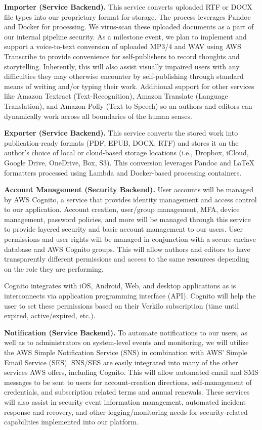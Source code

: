 \documentclass[11pt,openany]{book}
\begin{document}
\textbf{Importer (Service Backend).} This service converts uploaded RTF
or DOCX file types into our proprietary format for storage. The process
leverages Pandoc and Docker for processing. We virus-scan these uploaded
documents as a part of our internal pipeline security. As a milestone
event, we plan to implement and support a voice-to-text conversion of
uploaded MP3/4 and WAV using AWS Transcribe to provide convenience for
self-publishers to record thoughts and storytelling. Inherently, this
will also assist visually impaired users with any difficulties they may
otherwise encounter by self-publishing through standard means of writing
and/or typing their work. Additional support for other services like
Amazon Textract (Text-Recognition), Amazon Translate (Language
Translation), and Amazon Polly (Text-to-Speech) so an authors and
editors can dynamically work across all boundaries of the human senses.

\textbf{Exporter (Service Backend).} This service converts the stored
work into publication-ready formats (PDF, EPUB, DOCX, RTF) and stores it
on the author's choice of local or cloud-based storage locations (i.e.,
Dropbox, iCloud, Google Drive, OneDrive, Box, S3). This conversion
leverages Pandoc and LaTeX formatters processed using Lambda and
Docker-based processing containers.

\textbf{Account Management (Security Backend).} User accounts will be
managed by AWS Cognito, a service that provides identity management and
access control to our application. Account creation, user/group
management, MFA, device management, password policies, and more will be
managed through this service to provide layered security and basic
account management to our users. User permissions and user rights will
be managed in conjunction with a secure enclave database and AWS Cognito
groups. This will allow authors and editors to have transparently
different permissions and access to the same resources depending on the
role they are performing.

Cognito integrates with iOS, Android, Web, and desktop applications as
is interconnects via application programming interface (API). Cognito
will help the user to set these permissions based on their Verkilo
subscription (time until expired, active/expired, etc.).

\textbf{Notification (Service Backend).} To automate notifications to
our users, as well as to administrators on system-level events and
monitoring, we will utilize the AWS Simple Notification Service (SNS) in
combination with AWS' Simple Email Service (SES). SNS/SES are easily
integrated into many of the other services AWS offers, including
Cognito. This will allow automated email and SMS messages to be sent to
users for account-creation directions, self-management of credentials,
and subscription related terms and annual renewals. These services will
also assist in security event information management, automated incident
response and recovery, and other logging/monitoring needs for
security-related capabilities implemented into our platform.
\end{document}
